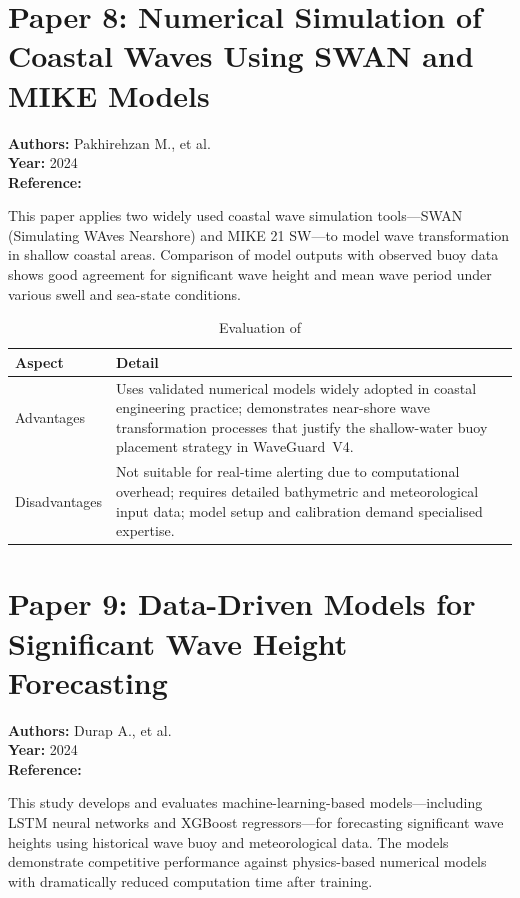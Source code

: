 \section{Paper 8: Numerical Simulation of Coastal Waves Using SWAN and MIKE Models}

\textbf{Authors:} Pakhirehzan M., et al.\\
\textbf{Year:} 2024\\
\textbf{Reference:} \cite{pakhirehzan2024numerical}

This paper applies two widely used coastal wave simulation tools---SWAN (Simulating
WAves Nearshore) and MIKE 21 SW---to model wave transformation in shallow coastal
areas.
Comparison of model outputs with observed buoy data shows good agreement for
significant wave height and mean wave period under various swell and sea-state
conditions.

\begin{table}[H]
\centering
\caption{Evaluation of \cite{pakhirehzan2024numerical}}
\label{tab:paper8}
\begin{tabularx}{\textwidth}{lX}
\toprule
\textbf{Aspect} & \textbf{Detail} \\
\midrule
Advantages &
  Uses validated numerical models widely adopted in coastal engineering practice;
  demonstrates near-shore wave transformation processes that justify the
  shallow-water buoy placement strategy in WaveGuard~V4. \\
\addlinespace
Disadvantages &
  Not suitable for real-time alerting due to computational overhead;
  requires detailed bathymetric and meteorological input data;
  model setup and calibration demand specialised expertise. \\
\bottomrule
\end{tabularx}
\end{table}

\section{Paper 9: Data-Driven Models for Significant Wave Height Forecasting}

\textbf{Authors:} Durap A., et al.\\
\textbf{Year:} 2024\\
\textbf{Reference:} \cite{durap2024waveheight}

This study develops and evaluates machine-learning-based models---including LSTM neural
networks and XGBoost regressors---for forecasting significant wave heights using
historical wave buoy and meteorological data.
The models demonstrate competitive performance against physics-based numerical models
with dramatically reduced computation time after training.

